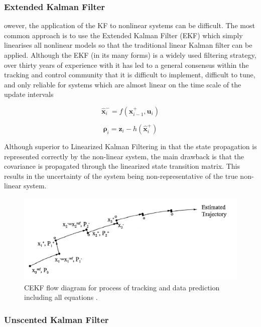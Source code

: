 \subsubsection{Extended Kalman Filter}

owever, the application of the KF to nonlinear systems can be difficult.
The most common approach is to use the Extended Kalman Filter (EKF) which simply linearises all nonlinear
models so that the traditional linear Kalman filter can be applied. Although the EKF (in its many forms) is a
widely used filtering strategy, over thirty years of experience with it has led to a general consensus within the
tracking and control community that it is difficult to implement, difficult to tune, and only reliable for systems
which are almost linear on the time scale of the update intervals

\begin{equation}
   \hat{\bm{x}}_{i}^- = f({\bm{x}}_{i-1}^+,\bm{u}_{i})
\end{equation}

\begin{equation}
   \bm{\rho}_i = \bm{z}_i - h(\hat{\bm{x}}_{i}^+)
\end{equation}

Although superior to Linearized Kalman Filtering in that the state propagation
is represented correctly by the non-linear system, the main drawback is that the
covariance is propagated through the linearized state transition matrix. This
results in the uncertainty of the system being non-representative of the true
non-linear system.

\begin{figure}[htp]
    \centering
    \includegraphics[width=0.8\linewidth]{graphics/ekf.PNG}
    \caption{CEKF flow diagram for process of tracking and data prediction including all equations \cite{3}.}
    \label{fig:LKF}
\end{figure}

\subsubsection{Unscented Kalman Filter}

